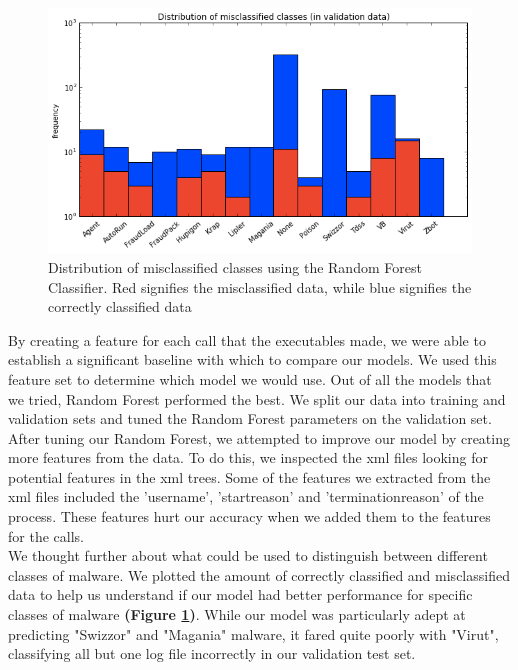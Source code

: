 \documentclass[11pt]{article}
\begin{document}
\begin{figure}[t]
\centering
\includegraphics[width=12cm]{misclassified_classes}
\caption{Distribution of misclassified classes using the Random Forest Classifier. Red signifies the misclassified data, while blue signifies the correctly classified data}
\label{fig:misclassified_classes}
\end{figure}

By creating a feature for each call that the executables made, we were able to establish a significant baseline with which to compare our models. We used this feature set to determine which model we would use. Out of all the models that we tried, Random Forest performed the best.  We split our data into training and validation sets and tuned the Random Forest parameters on the validation set.\\

After tuning our Random Forest, we attempted to improve our model by creating more features from the data.  To do this, we inspected the xml files looking for potential features in the xml trees.  Some of the features we extracted from the xml files included the 'username', 'startreason' and 'terminationreason' of the process. These features hurt our accuracy when we added them to the features for the calls. \\

We thought further about what could be used to distinguish between different classes of malware.  We plotted the amount of correctly classified and misclassified data to help us understand if our model had better performance for specific classes of malware \textbf{(Figure \ref{fig:misclassified_classes})}.  While our model was particularly adept at predicting "Swizzor" and "Magania" malware, it fared quite poorly with "Virut", classifying all but one log file incorrectly in our validation test set.\\
\end{document}

